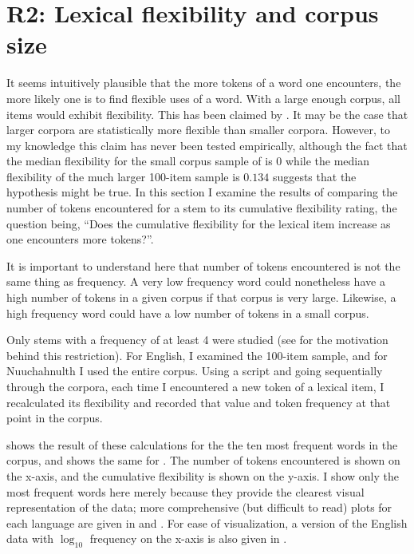 \section{R2: Lexical flexibility and corpus size}
\label{sec:4.4}

It seems intuitively plausible that the more tokens of a word one encounters, the more likely one is to find flexible uses of a word. With a large enough corpus, all items would exhibit flexibility. This has been claimed by \textcite[77]{MoselHovdhaugen1992}. It may be the case that larger corpora are statistically more flexible than smaller corpora. However, to my knowledge this claim has never been tested empirically, although the fact that the median flexibility for the small corpus sample of  is $0$ while the median flexibility of the much larger 100-item sample is $0.134$ suggests that the hypothesis might be true. In this section I examine the results of comparing the number of tokens encountered for a stem to its cumulative flexibility rating, the question being, \enquote{Does the cumulative flexibility for the lexical item increase as one encounters more tokens?}.

It is important to understand here that number of tokens encountered is not the same thing as frequency. A very low frequency word could nonetheless have a high number of tokens in a given corpus if that corpus is very large. Likewise, a high frequency word could have a low number of tokens in a small corpus.

Only stems with a frequency of at least 4 were studied (see  for the motivation behind this restriction). For English, I examined the 100-item sample, and for Nuuchahnulth I used the entire corpus. Using a script and going sequentially through the corpora, each time I encountered a new token of a lexical item, I recalculated its flexibility and recorded that value and token frequency at that point in the corpus.

 shows the result of these calculations for the the ten most frequent words in the  corpus, and  shows the same for . The number of tokens encountered is shown on the x-axis, and the cumulative flexibility is shown on the y-axis. I show only the most frequent words here merely because they provide the clearest visual representation of the data; more comprehensive (but difficult to read) plots for each language are given in  and . For ease of visualization, a version of the English data with $\log_{10}$ frequency on the x-axis is also given in .


